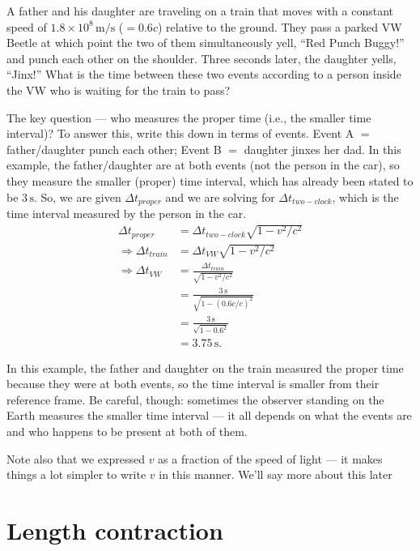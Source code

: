    
\begin{example}
A father and his daughter are traveling on a train that moves with a 
constant speed of $1.8\times 10^8\,\text{m/s}$ ($= 0.6c$)
relative to the ground.  They pass a parked VW Beetle at which point
the two of them simultaneously yell, ``Red Punch Buggy!'' and punch each
other on the shoulder.  Three seconds later, the daughter yells,
``Jinx!''  What is the time between these two events according to a
person inside the VW who is waiting for the train to pass?


\solution
The key question ---  who measures the proper time (i.e., the
smaller time interval)?  To answer this, write this down in terms of
events.  Event A $=$ father/daughter punch each other; Event B $=$
daughter jinxes her dad.  In this example, the father/daughter are at
both events (not the person in the car), so they measure the smaller
(proper) time interval, which has already been stated to be $3\,\text{s}$.  
So, we are given $\Delta t_{ proper}$ and we are solving for 
$\Delta t_{ two-clock}$, 
which is the time interval measured by the person in the car.
\begin{align}
\Delta t_{ proper} &= \Delta t_{ two-clock}\sqrt{1-v^2/c^2}  \\
\Rightarrow \Delta t_{ train} &= 
                \Delta t_{ VW}\sqrt{1-v^2/c^2} \\
\Rightarrow \Delta t_{ VW} &= 
                \frac{\Delta t_{ train}}{\sqrt{1-v^2/c^2}} \\
                   &= \frac{3\,\text{s}}{\sqrt{1-(0.6c/c)^2}} \\
                   &= \frac{3\,\text{s}}{\sqrt{1-0.6^2}} \\
                   &= 3.75\,\text{s}.
\end{align}
\end{example}

In this example, the father and daughter on the train measured the
proper time because they were at both events, so the time interval is
smaller from their reference frame.  Be careful, though: sometimes the
observer standing on the Earth measures the smaller time interval --- it
all depends on what the events are and who happens to be present at
both of them.
   
Note also that we expressed $v$ as a fraction of the speed of light --- it
makes things a lot simpler to write $v$ in this manner.  We'll say more
about this later

\section{Length contraction}

